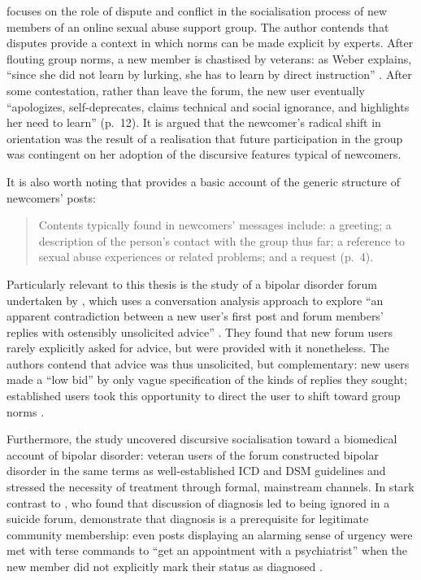 		 \textcite{weber_missed_2011} focuses on the role of dispute and conflict in the socialisation process of new members of an online sexual abuse support group. The author contends that disputes provide a context in which norms can be made explicit by experts. After flouting group norms, a new member is chastised by veterans: as Weber explains, ``since she did not learn by lurking, she has to learn by direct instruction'' \citeyear[p.~1]{weber_missed_2011}. After some contestation, rather than leave the forum, the new user eventually ``apologizes, self-deprecates, claims technical and social ignorance, and highlights her need to learn'' (p.~12). It is argued that the newcomer's radical shift in orientation was the result of a realisation that future participation in the group was contingent on her adoption of the discursive features typical of newcomers.

		 It is also worth noting that \textcite{weber_missed_2011} provides a basic account of the generic structure of newcomers' posts:

		 \begin{quote}\small\singlespacing
		 Contents typically found in newcomers' messages include: a greeting; a description of the person's contact with the group thus far; a reference to sexual abuse experiences or related problems; and a request (p.~4).
		 \end{quote}
		 Particularly relevant to this thesis is the study of a bipolar disorder forum undertaken by \textcite{vayreda_social_2009}, which uses a conversation analysis approach to explore ``an apparent contradiction between a new user's first post and forum members' replies with ostensibly unsolicited advice'' \citeyear[p.~931]{vayreda_social_2009}. They found that new forum users rarely explicitly asked for advice, but were provided with it nonetheless. The authors contend that advice was thus unsolicited, but complementary: new users made a ``low bid'' by only vague specification of the kinds of replies they sought; established users took this opportunity to direct the user to shift toward group norms \citeyear[p.~940]{vayreda_social_2009}.

	  Furthermore, the study uncovered discursive socialisation toward a biomedical account of bipolar disorder: veteran users of the forum constructed bipolar disorder in the same terms as well-established ICD and DSM guidelines and stressed the necessity of treatment through formal, mainstream channels. In stark contrast to \textcite{horne_doing_2009}, who found that discussion of diagnosis led to being ignored in a suicide forum,  demonstrate that diagnosis is a prerequisite for legitimate community membership: even posts displaying an alarming sense of urgency were met with terse commands to ``get an appointment with a psychiatrist'' when the new member did not explicitly mark their status as diagnosed \citeyear[p.~940]{vayreda_social_2009}.


